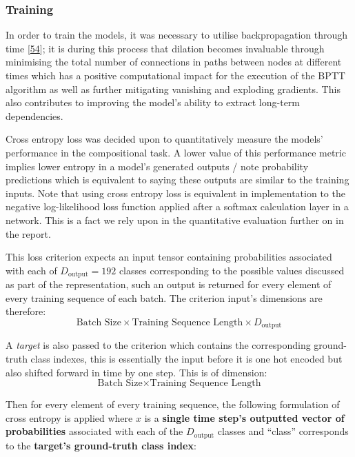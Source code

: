 \documentclass[12pt,]{article}
\begin{document}
\hypertarget{training}{%
\subsubsection{Training}\label{training}}

In order to train the models, it was necessary to utilise
backpropagation through time
{[}\protect\hyperlink{ref-werbos1990backpropagation}{54}{]}; it is
during this process that dilation becomes invaluable through minimising
the total number of connections in paths between nodes at different
times which has a positive computational impact for the execution of the
BPTT algorithm as well as further mitigating vanishing and exploding
gradients. This also contributes to improving the model's ability to
extract long-term dependencies.

Cross entropy loss was decided upon to quantitatively measure the
models' performance in the compositional task. A lower value of this
performance metric implies lower entropy in a model's generated outputs
/ note probability predictions which is equivalent to saying these
outputs are similar to the training inputs. Note that using cross
entropy loss is equivalent in implementation to the negative
log-likelihood loss function applied after a softmax calculation layer
in a network. This is a fact we rely upon in the quantitative evaluation
further on in the report.

This loss criterion expects an input tensor containing probabilities
associated with each of \(D_{\text{output}} = 192\) classes
corresponding to the possible values discussed as part of the
representation, such an output is returned for every element of every
training sequence of each batch. The criterion input's dimensions are
therefore:
\[\text{Batch Size} \times \text{Training Sequence Length} \times D_{\text{output}}\]

A \emph{target} is also passed to the criterion which contains the
corresponding ground-truth class indexes, this is essentially the input
before it is one hot encoded but also shifted forward in time by one
step. This is of dimension:
\[\text{Batch Size} \times \text{Training Sequence Length}\]

Then for every element of every training sequence, the following
formulation of cross entropy is applied where \(x\) is a \textbf{single
time step's outputted vector of probabilities} associated with each of
the \(D_{\text{output}}\) classes and ``class'' corresponds to the
\textbf{target's ground-truth class index}:
\end{document}
